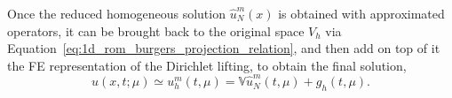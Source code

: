 \documentclass[../../thesis.tex]{subfiles}
\newcommand{\rbV}{\ensuremath{\mathbb{V}}}
\begin{document}

Once the reduced homogeneous solution $\hat{u}^{m}_N(x)$ is obtained 
with approximated operators, it can be brought back to the original space $V_h$ 
via Equation~\eqref{eq:1d_rom_burgers_projection_relation}, 
and then add on top of it the FE representation of the Dirichlet lifting, 
to obtain the final solution,
\begin{equation}
    u(x, t; \mu) \simeq u_h^{m}(t, \mu) = \rbV \hat{u}^{m}_N(t, \mu) + g_h(t,\mu).
\end{equation}
\end{document}
